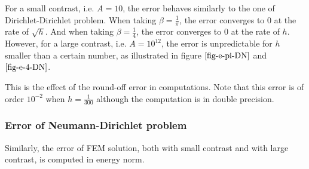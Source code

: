 \documentclass[12pt]{article}
\begin{document}
For a small contrast, i.e. $A=10$, the error behaves similarly to the one of Dirichlet-Dirichlet problem. When taking $\beta=\frac{1}{\pi}$, the error converges to $0$ at the rate of $\sqrt{h}$. And when taking $\beta=\frac{1}{4}$, the error converges to $0$ at the rate of $h$. However, for a large contrast, i.e. $A=10^{12}$, the error is unpredictable for $h$ smaller than a certain number, as illustrated in figure $\ref{fig-e-pi-DN}$ and $\ref{fig-e-4-DN}$.

This is the effect of the round-off error in computations. Note that this error is of order $10^{-2}$ when $h=\frac{1}{300}$ although the computation is in double precision.

\subsubsection{Error of Neumann-Dirichlet problem}
Similarly, the error of FEM solution, both with small contrast and with large contrast, is computed in energy norm.
\end{document}
